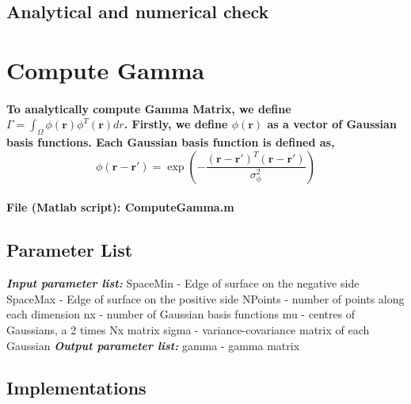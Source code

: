 \documentclass[a4paper, 12pt, english]{article}
\begin{document}
\subsection{Analytical and numerical check}



\newpage

\section{Compute Gamma}

\paragraph{To analytically compute Gamma Matrix, we define
$\Gamma=\int_{\Omega}\phi(\boldsymbol{r})\phi^{T}(\boldsymbol{r})dr$.
Firstly, we define $\phi(\boldsymbol{r})$ as a vector of Gaussian basis functions.
Each Gaussian basis function is defined as,
$$\phi(\boldsymbol{r}-\boldsymbol{r}\prime)=\exp{\left(-\frac{(\boldsymbol{r}-\boldsymbol{r}\prime)^{T}(\boldsymbol{r}-\boldsymbol{r}\prime)}{\sigma_{\phi}^{2}}\right)}$$}

\paragraph{File (Matlab script): ComputeGamma.m}

\subsection{Parameter List}
\textbf{\textit{Input parameter list:}}\newline
SpaceMin - Edge of surface on the negative side\newline
SpaceMax - Edge of surface on the positive side\newline
NPoints - number of points along each dimension\newline
nx - number of Gaussian basis functions\newline
mu - centres of Gaussians, a 2 times Nx matrix\newline
sigma - variance-covariance matrix of each Gaussian\newline
\textbf{\textit{Output parameter list:}}\newline
gamma - gamma matrix

\subsection{Implementations}
\end{document}
